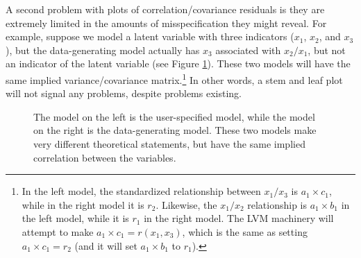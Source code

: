 \documentclass[
  english,
  doc]{apa6}
\begin{document}
A second problem with plots of correlation/covariance residuals is they are extremely limited in the amounts of misspecification they might reveal. For example, suppose we model a latent variable with three indicators (\(x_1\), \(x_2\), and \(x_3\)), but the data-generating model actually has \(x_3\) associated with \(x_2/x_1\), but not an indicator of the latent variable (see Figure \ref{fig:implied}). These two models will have the same implied variance/covariance matrix.\footnote{In the left model, the standardized relationship between \(x_1/x_3\) is \(a_1\times c_1\), while in the right model it is \(r_2\). Likewise, the \(x_1/x_2\) relationship is \(a_1\times b_1\) in the left model, while it is \(r_1\) in the right model. The LVM machinery will attempt to make \(a_1\times c_1 = r(x_1, x_3)\), which is the same as setting \(a_1\times c_1 = r_2\) (and it will set \(a_1\times b_1\) to \(r_1\)).} In other words, a stem and leaf plot will not signal any problems, despite problems existing.

\begin{figure}
\begin{center}
\end{center}
\caption{The model on the left is the user-specified model, while the model on the right is the data-generating model. These two models make very different theoretical statements, but have the same implied correlation between the variables.}
\label{fig:implied}
\end{figure}
\end{document}
